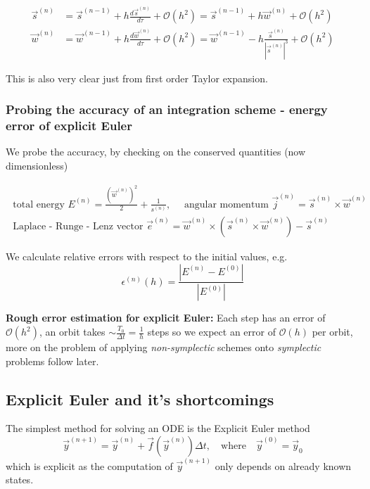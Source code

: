 \begin{equation}
  \begin{aligned}
    \vec{s}^{(n)} &= \vec{s}^{(n-1)} + h \frac{d\vec{s}^{(n)}}{d\tau} + \mathcal{O}(h^2) = \vec{s}^{(n-1)} + h \vec{w}^{(n)} + \mathcal{O}(h^2)\\
    \vec{w}^{(n)} &= \vec{w}^{(n-1)} + h \frac{d\vec{w}^{(n)}}{d\tau} + \mathcal{O}(h^2) = \vec{w}^{(n-1)} - h \frac{\vec{s}^{(n)}}{|\vec{s}^{(n)}|^3} + \mathcal{O}(h^2)
  \end{aligned}
\end{equation}

This is also very clear just from first order Taylor expansion.

\subsubsection{Probing the accuracy of an integration scheme - energy error of explicit Euler}
We probe the accuracy, by checking on the conserved quantities (now dimensionless)

\begin{equation}
  \begin{gathered}
    \text { total energy } E^{(n)}=\frac{\left(\vec{w}^{(n)}\right)^2}{2}+\frac{1}{s^{(n)}}, \quad \text { angular momentum } \vec{j}^{(n)}=\vec{s}^{(n)} \times \vec{w}^{(n)} \\
    \text { Laplace - Runge - Lenz vector } \vec{e}^{(n)} =\vec{w}^{(n)} \times\left(\vec{s}^{(n)} \times \vec{w}^{(n)}\right)-\vec{s}^{(n)}
    \end{gathered}
\end{equation}


We calculate relative errors with respect
to the initial values, e.g.
\[
    \epsilon^{(n)}(h) = \frac{|E^{(n)} - E^{(0)}|}{|E^{(0)}|}
\]

\textbf{Rough error estimation for explicit Euler:} Each step has an error of $\mathcal{O}(h^2)$, an orbit takes $\sim \frac{T_0}{\Delta t} = \frac{1}{h}$ steps so we expect an error of $\mathcal{O}(h)$ per orbit, more on the problem of applying \textit{non-symplectic} schemes onto \textit{symplectic} problems follow later.

\subsection{Explicit Euler and it's shortcomings}
The simplest method for solving an ODE is the Explicit Euler method
\[
    \vec{y}^{(n+1)} = \vec{y}^{(n)} + \vec{f} \left( \vec{y}^{(n)} \right) \Delta t, \quad\mathrm{where}\quad   \vec{y}^{(0)} = \vec{y}_0
\]
which is explicit as the computation of $\vec{y}^{(n+1)}$ only depends on already known states.

